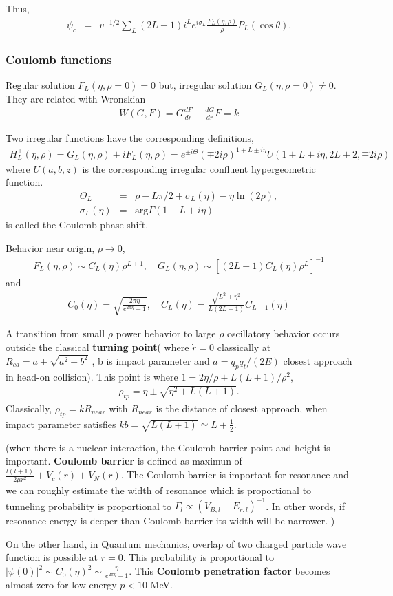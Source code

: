 \documentclass[10pt]{book}
\newcommand{\bea}{\begin{eqnarray}}
\newcommand{\eea}{\end{eqnarray}}
\newcommand{\no}{\nonumber \\}
\begin{document}
Thus, 
\bea 
\psi_c&=&v^{-1/2}\sum_L (2L+1)i^L e^{i\sigma_L}\frac{F_L(\eta,\rho)}{\rho} P_L(\cos\theta) .
\eea 


\subsubsection{Coulomb functions}
Regular solution $F_L(\eta,\rho=0)=0$ but,
irregular solution $G_L(\eta,\rho=0)\neq 0$.
They are related with Wronskian
\bea
W(G,F)=G \frac{dF}{dr}-\frac{dG}{dr} F=k
\eea


Two irregular functions have the corresponding definitions,
\bea
H_L^{\pm}(\eta,\rho)
=G_L(\eta,\rho)\pm i F_L(\eta,\rho)
=e^{\pm i \Theta}(\mp 2i \rho)^{1+L\pm i\eta}
 U(1+L\pm i\eta,2L+2,\mp 2i\rho) 
\eea
where $U(a,b,z)$ is the corresponding irregular confluent hypergeometric function. 
\bea
\Theta_L&=&\rho-L\pi/2+\sigma_L(\eta)-\eta\ln(2\rho) ,\no 
\sigma_L(\eta)&=&\mbox{arg} \Gamma(1+L+i\eta)
\eea
is called the Coulomb phase shift.

Behavior near origin, $\rho\to 0$,
\bea
F_L(\eta,\rho)\sim C_L(\eta) \rho^{L+1},
\quad G_L(\eta,\rho)\sim [(2L+1)C_L(\eta)\rho^L]^{-1}
\eea
and
\bea
C_0(\eta)=\sqrt{\frac{2\pi\eta}{e^{2\pi\eta}-1}},
\quad C_L(\eta)=\frac{\sqrt{L^2+\eta^2}}{L(2L+1)} C_{L-1}(\eta)
\eea

A transition from small $\rho$ power behavior to large $\rho$
oscillatory behavior occurs outside the classical {\bf turning point}(
where $\dot{r}=0$ classically at $R_{ca}=a+\sqrt{a^2+b^2}$
, b is impact parameter and $a=q_p q_t/(2E)$ closest approach in head-on collision).
This point is where $1=2\eta/\rho+L(L+1)/\rho^2$,
\bea
\rho_{tp}=\eta\pm \sqrt{\eta^2+L(L+1)}.
\eea
Classically, $\rho_{tp}=kR_{near}$ with $R_{near}$ is the distance
of closest approach, when impact parameter satisfies
$kb=\sqrt{L(L+1)}\simeq L+\frac{1}{2}$.

(when there is a nuclear interaction, the Coulomb barrier point and height 
is important. {\bf Coulomb barrier} is defined as maximun of $\frac{l(l+1)}{2\mu r^2}+V_c(r)+V_N(r)$.
The Coulomb barrier is important for resonance and we can roughly 
estimate the width of resonance which is proportional to tunneling probability
is proportional to $\Gamma_l\propto (V_{B,l}-E_{r,l})^{-1} $. In other words,
if resonance energy is deeper than Coulomb barrier its width will be narrower. 
)

On the other hand, in Quantum mechanics,
overlap of two charged particle wave function is possible at $r=0$.
This probability is proportional to 
$|\psi(0)|^2\sim C_0(\eta)^2\sim \frac{\eta}{e^{2\pi\eta}-1}$.
This {\bf Coulomb penetration factor} 
becomes almost zero for low energy $p<10$ MeV.
\end{document}
